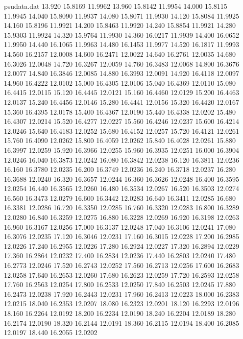 \begin{filecontents*}{psudata.dat}
13.920 15.8169 11.9962
13.960 15.8142 11.9954
14.000 15.8115 11.9945
14.040 15.8090 11.9937
14.080 15.8071 11.9930
14.120 15.8084 11.9925
14.160 15.8196 11.9921
14.200 15.8463 11.9920
14.240 15.8854 11.9921
14.280 15.9303 11.9924
14.320 15.9764 11.9930
14.360 16.0217 11.9939
14.400 16.0652 11.9950
14.440 16.1065 11.9963
14.480 16.1453 11.9977
14.520 16.1817 11.9993
14.560 16.2157 12.0008
14.600 16.2471 12.0022
14.640 16.2761 12.0035
14.680 16.3026 12.0048
14.720 16.3267 12.0059
14.760 16.3483 12.0068
14.800 16.3676 12.0077
14.840 16.3846 12.0085
14.880 16.3993 12.0091
14.920 16.4118 12.0097
14.960 16.4222 12.0102
15.000 16.4305 12.0106
15.040 16.4369 12.0110
15.080 16.4415 12.0115
15.120 16.4445 12.0121
15.160 16.4460 12.0129
15.200 16.4463 12.0137
15.240 16.4456 12.0146
15.280 16.4441 12.0156
15.320 16.4420 12.0167
15.360 16.4395 12.0178
15.400 16.4367 12.0190
15.440 16.4338 12.0202
15.480 16.4307 12.0214
15.520 16.4277 12.0227
15.560 16.4246 12.0237
15.600 16.4214 12.0246
15.640 16.4183 12.0252
15.680 16.4152 12.0257
15.720 16.4121 12.0261
15.760 16.4090 12.0262
15.800 16.4059 12.0262
15.840 16.4028 12.0261
15.880 16.3997 12.0259
15.920 16.3966 12.0255
15.960 16.3935 12.0251
16.000 16.3904 12.0246
16.040 16.3873 12.0242
16.080 16.3842 12.0238
16.120 16.3811 12.0236
16.160 16.3780 12.0235
16.200 16.3749 12.0236
16.240 16.3718 12.0237
16.280 16.3688 12.0240
16.320 16.3657 12.0244
16.360 16.3626 12.0248
16.400 16.3595 12.0254
16.440 16.3565 12.0260
16.480 16.3534 12.0267
16.520 16.3503 12.0274
16.560 16.3473 12.0279
16.600 16.3442 12.0283
16.640 16.3411 12.0285
16.680 16.3381 12.0286
16.720 16.3350 12.0285
16.760 16.3320 12.0283
16.800 16.3289 12.0280
16.840 16.3259 12.0275
16.880 16.3228 12.0269
16.920 16.3198 12.0263
16.960 16.3167 12.0256
17.000 16.3137 12.0248
17.040 16.3106 12.0241
17.080 16.3076 12.0235
17.120 16.3046 12.0231
17.160 16.3015 12.0228
17.200 16.2985 12.0226
17.240 16.2955 12.0226
17.280 16.2924 12.0227
17.320 16.2894 12.0229
17.360 16.2864 12.0232
17.400 16.2834 12.0236
17.440 16.2803 12.0240
17.480 16.2773 12.0246
17.520 16.2743 12.0252
17.560 16.2713 12.0256
17.600 16.2683 12.0258
17.640 16.2653 12.0260
17.680 16.2623 12.0259
17.720 16.2593 12.0258
17.760 16.2563 12.0254
17.800 16.2533 12.0250
17.840 16.2503 12.0245
17.880 16.2473 12.0238
17.920 16.2443 12.0231
17.960 16.2413 12.0223
18.000 16.2383 12.0215
18.040 16.2353 12.0207
18.080 16.2323 12.0201
18.120 16.2293 12.0196
18.160 16.2264 12.0192
18.200 16.2234 12.0190
18.240 16.2204 12.0189
18.280 16.2174 12.0190
18.320 16.2144 12.0191
18.360 16.2115 12.0194
18.400 16.2085 12.0197
18.440 16.2055 12.0202

\end{filecontents*}

